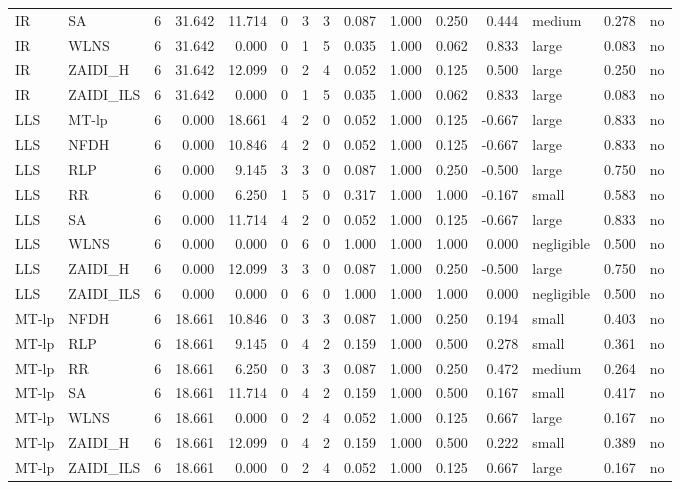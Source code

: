 \begin{table}[htbp]
\begin{tabular}{llrrrrrrrrrrlrr}
IR & SA & 6 & 31.642 & 11.714 & 0 & 3 & 3 & 0.087 & 1.000 & 0.250 & 0.444 & medium & 0.278 & no \\
IR & WLNS & 6 & 31.642 & 0.000 & 0 & 1 & 5 & 0.035 & 1.000 & 0.062 & 0.833 & large & 0.083 & no \\
IR & ZAIDI\_H & 6 & 31.642 & 12.099 & 0 & 2 & 4 & 0.052 & 1.000 & 0.125 & 0.500 & large & 0.250 & no \\
IR & ZAIDI\_ILS & 6 & 31.642 & 0.000 & 0 & 1 & 5 & 0.035 & 1.000 & 0.062 & 0.833 & large & 0.083 & no \\
LLS & MT-lp & 6 & 0.000 & 18.661 & 4 & 2 & 0 & 0.052 & 1.000 & 0.125 & -0.667 & large & 0.833 & no \\
LLS & NFDH & 6 & 0.000 & 10.846 & 4 & 2 & 0 & 0.052 & 1.000 & 0.125 & -0.667 & large & 0.833 & no \\
LLS & RLP & 6 & 0.000 & 9.145 & 3 & 3 & 0 & 0.087 & 1.000 & 0.250 & -0.500 & large & 0.750 & no \\
LLS & RR & 6 & 0.000 & 6.250 & 1 & 5 & 0 & 0.317 & 1.000 & 1.000 & -0.167 & small & 0.583 & no \\
LLS & SA & 6 & 0.000 & 11.714 & 4 & 2 & 0 & 0.052 & 1.000 & 0.125 & -0.667 & large & 0.833 & no \\
LLS & WLNS & 6 & 0.000 & 0.000 & 0 & 6 & 0 & 1.000 & 1.000 & 1.000 & 0.000 & negligible & 0.500 & no \\
LLS & ZAIDI\_H & 6 & 0.000 & 12.099 & 3 & 3 & 0 & 0.087 & 1.000 & 0.250 & -0.500 & large & 0.750 & no \\
LLS & ZAIDI\_ILS & 6 & 0.000 & 0.000 & 0 & 6 & 0 & 1.000 & 1.000 & 1.000 & 0.000 & negligible & 0.500 & no \\
MT-lp & NFDH & 6 & 18.661 & 10.846 & 0 & 3 & 3 & 0.087 & 1.000 & 0.250 & 0.194 & small & 0.403 & no \\
MT-lp & RLP & 6 & 18.661 & 9.145 & 0 & 4 & 2 & 0.159 & 1.000 & 0.500 & 0.278 & small & 0.361 & no \\
MT-lp & RR & 6 & 18.661 & 6.250 & 0 & 3 & 3 & 0.087 & 1.000 & 0.250 & 0.472 & medium & 0.264 & no \\
MT-lp & SA & 6 & 18.661 & 11.714 & 0 & 4 & 2 & 0.159 & 1.000 & 0.500 & 0.167 & small & 0.417 & no \\
MT-lp & WLNS & 6 & 18.661 & 0.000 & 0 & 2 & 4 & 0.052 & 1.000 & 0.125 & 0.667 & large & 0.167 & no \\
MT-lp & ZAIDI\_H & 6 & 18.661 & 12.099 & 0 & 4 & 2 & 0.159 & 1.000 & 0.500 & 0.222 & small & 0.389 & no \\
MT-lp & ZAIDI\_ILS & 6 & 18.661 & 0.000 & 0 & 2 & 4 & 0.052 & 1.000 & 0.125 & 0.667 & large & 0.167 & no \\

\end{tabular}
\end{table}
